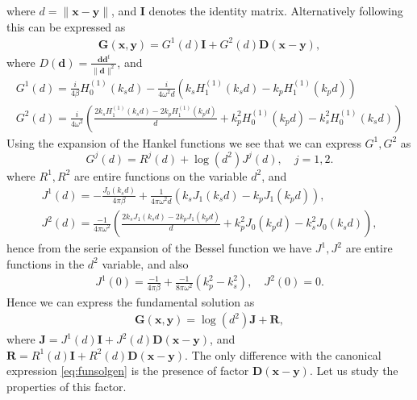 \documentclass{article}
\newcommand{\bx}{\bm{x}}
\newcommand{\by}{\bm{y}}
\begin{document}
where $d = \| \bx -\by\|$, and $\mathbf{I}$ denotes the identity matrix. Alternatively following \cite{kress1996} this can be expressed as 
\begin{align*}
\mathbf{G}(\mathbf{x},\mathbf{y})  = G^1(d) \mathbf{I} + 
{G}^2(d)\mathbf{D}(\mathbf{x}-\mathbf{y}),
\end{align*}
where  $D(\mathbf{d}) = \frac{\mathbf{d} \mathbf{d}^t}{\|\mathbf{d}\|^2}$, and 
\begin{align*}
G^1(d) = \frac{i}{4\beta} H_{0}^{(1)}(k_s d) - \frac{i}{4\omega^2d}(k_s H_1^{(1)}(k_s d)- k_p H_1^{(1)}(k_p d)) \\
G^2(d) = \frac{i}{4\omega^2} \left( 
\frac{2k_s H^{(1)}_1(k_s d)-2k_p H^{(1)}_1(k_p d)}{d}+
k_p^2H^{(1)}_0(k_p d)- k_s^2H^{(1)}_0(k_s d)  
\right)
\end{align*}
Using the expansion of the Hankel functions \cite[9.1.10 and 9.1.11]{abramowitz1965handbook} we see that we can express $G^1,G^2$ as 
$$
G^j(d) = R^j(d) +\log(d^2)J^j(d), \quad j=1,2.
$$
where $R^1,R^2$ are entire functions on the variable $d^2$, and 
\begin{align*}
J^1(d) = -\frac{J_0(k_s d)}{4\pi\beta}+ \frac{1}{4\pi\omega^2 d}(k_sJ_1(k_s d) - k_p J_1(k_p d)), \\
J^2(d) = \frac{-1}{4 \pi \omega^2} \left(
\frac{2k_s J_1(k_sd)-2k_p J_1(k_p d)}{d} +k_p^2J_0(k_p d) -k_s^2J_0(k_s d)
\right),
\end{align*}
hence from the serie expansion of the Bessel function we have $J^1,J^2$ are entire functions in the $d^2$ variable, and also 
\begin{align*}
J^1(0) = \frac{-1}{4\pi\beta} + \frac{-1}{8 \pi\omega^2}(k_p^2-k_s^2), \quad J^2(0) = 0.
\end{align*}
Hence we can express the fundamental solution as 
\begin{align*}
\mathbf{G}(\bx,\by) = \log(d^2)\mathbf{J}+ \mathbf{R},
\end{align*}
where $\mathbf{J} = J^1(d) \mathbf{I} +J^2(d)\mathbf{D}(\bx-\by)$, and 
$\mathbf{R} = R^1(d) \mathbf{I} +R^2(d) \mathbf{D}(\bx-\by)$. The only difference with the canonical expression  \eqref{eq:funsolgen} is the presence of factor $\mathbf{D}(\bx-\by)$. Let us study the properties of this factor. 
\end{document}
